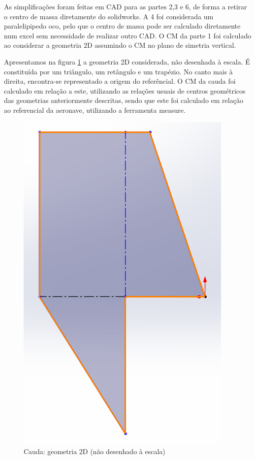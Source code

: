 As simplificações foram feitas em CAD para as partes 2,3 e 6, de forma a retirar o centro de massa diretamente do solidworks. A 4 foi considerada um paralelipipedo oco, pelo que o centro de massa pode ser calculado diretamente num excel sem necessidade de realizar outro CAD. O CM da parte 1 foi calculado ao considerar a geometria 2D assumindo o CM no plano de simetria vertical.\par
Apresentamos na figura \ref{cauda2D} a geometria 2D considerada, não desenhada à escala. É constituída por um triângulo, um retângulo e um trapézio. No canto mais à direita, encontra-se representado a origem do referêncial. O CM da cauda foi calculado em relação a este, utilizando as relações usuais de centros geométricos das geometrias anteriormente descritas, sendo que este foi calculado em relação ao referencial da aeronave, utilizando a ferramenta measure.
\FloatBarrier
\begin{figure}[h]
    \centering
    \includegraphics[scale=0.7]{Imagens/cauda2D.PNG}
    \caption{Cauda: geometria 2D (não desenhado à escala)}
    \label{cauda2D}
\end{figure}
